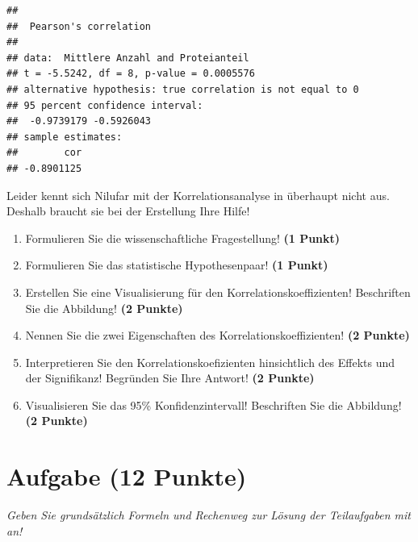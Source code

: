 \documentclass[a4paper, 9pt]{scrartcl}\usepackage[]{graphicx}\usepackage[]{xcolor}
\makeatletter
\newenvironment{kframe}{%
 \def\at@end@of@kframe{}%
 \ifinner\ifhmode%
  \def\at@end@of@kframe{\end{minipage}}%
  \begin{minipage}{\columnwidth}%
 \fi\fi%
 \def\FrameCommand##1{\hskip\@totalleftmargin \hskip-\fboxsep
 \colorbox{shadecolor}{##1}\hskip-\fboxsep
     \hskip-\linewidth \hskip-\@totalleftmargin \hskip\columnwidth}%
 \MakeFramed {\advance\hsize-\width
   \@totalleftmargin\z@ \linewidth\hsize
   \@setminipage}}%
 {\par\unskip\endMakeFramed%
 \at@end@of@kframe}
\newenvironment{knitrout}{}{} %
\makeatother
\begin{document}
\begin{knitrout}
\color{fgcolor}\begin{kframe}
\begin{verbatim}
## 
## 	Pearson's correlation
## 
## data:  Mittlere Anzahl and Proteianteil
## t = -5.5242, df = 8, p-value = 0.0005576
## alternative hypothesis: true correlation is not equal to 0
## 95 percent confidence interval:
##  -0.9739179 -0.5926043
## sample estimates:
##        cor 
## -0.8901125
\end{verbatim}
\end{kframe}
\end{knitrout}

Leider kennt sich Nilufar mit der Korrelationsanalyse in \Rlogo überhaupt nicht aus. Deshalb braucht sie bei der Erstellung Ihre Hilfe!

\begin{enumerate}
  \item Formulieren Sie die wissenschaftliche Fragestellung! \textbf{(1 Punkt)}
  \item Formulieren Sie das statistische Hypothesenpaar! \textbf{(1 Punkt)}
\item Erstellen Sie eine Visualisierung für den Korrelationskoeffizienten! Beschriften Sie die Abbildung! \textbf{(2 Punkte)}
\item Nennen Sie die zwei Eigenschaften des Korrelationskoeffizienten! \textbf{(2 Punkte)}
\item Interpretieren Sie den Korrelationskoefizienten hinsichtlich des
  Effekts und der Signifikanz! Begründen Sie Ihre Antwort! \textbf{(2 Punkte)}
\item Visualisieren Sie das 95\% Konfidenzintervall! Beschriften Sie die Abbildung! \textbf{(2 Punkte)} 
\end{enumerate} 
\clearpage

\section{Aufgabe \hfill (12 Punkte)}

\textit{Geben Sie grundsätzlich Formeln und Rechenweg zur Lösung der Teilaufgaben mit an!} \\[1Ex]
 
\end{document}
